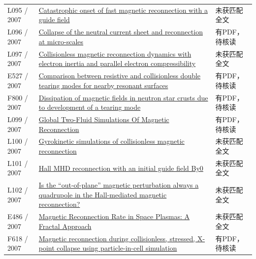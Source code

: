 \documentclass[UTF8,a4paper,11pt,openany,fontset=fandol]{ctexbook}
\begin{document}
\begin{longtable}{P{24mm}P{97mm}P{27mm}}
L095 / 2007 & \href{https://doi.org/10.1063/1.2734948}{Catastrophic onset of fast magnetic reconnection with a guide field} & 未获匹配全文\\

L096 / 2007 & \href{https://doi.org/10.1017/s0022377807006757}{Collapse of the neutral current sheet and reconnection at micro-scales} & 有PDF，待核读\\

L097 / 2007 & \href{https://doi.org/10.1017/s0022377806006313}{Collisionless magnetic reconnection dynamics with electron inertia and parallel electron compressibility} & 未获匹配全文\\

E527 / 2007 & \href{https://doi.org/10.1088/0741-3335/49/5/008}{Comparison between resistive and collisionless double tearing modes for nearby resonant surfaces} & 有PDF，待核读\\

F800 / 2007 & \href{https://doi.org/10.48550/arxiv.0705.3186}{Dissipation of magnetic fields in neutron star crusts due to development of a tearing mode} & 有PDF，待核读\\

L099 / 2007 & \href{https://doi.org/10.5281/zenodo.47873}{Global Two-Fluid Simulations Of Magnetic Reconnection} & 有PDF，待核读\\

L100 / 2007 & \href{https://doi.org/10.1063/1.2774003}{Gyrokinetic simulations of collisionless magnetic reconnection} & 未获匹配全文\\

L101 / 2007 & \href{https://doi.org/10.1016/j.asr.2007.09.035}{Hall MHD reconnection with an initial guide field By0} & 未获匹配全文\\

L102 / 2007 & \href{https://doi.org/10.1063/1.2820904}{Is the “out-of-plane” magnetic perturbation always a quadrupole in the Hall-mediated magnetic reconnection?} & 未获匹配全文\\

E486 / 2007 & \href{https://doi.org/10.1103/physrevlett.99.175002}{Magnetic Reconnection Rate in Space Plasmas: A Fractal Approach} & 未获匹配全文\\

F618 / 2007 & \href{https://doi.org/10.1063/1.2800854}{Magnetic reconnection during collisionless,  stressed,  X-point collapse using particle-in-cell simulation} & 有PDF，待核读\\


\end{longtable}
\end{document}
